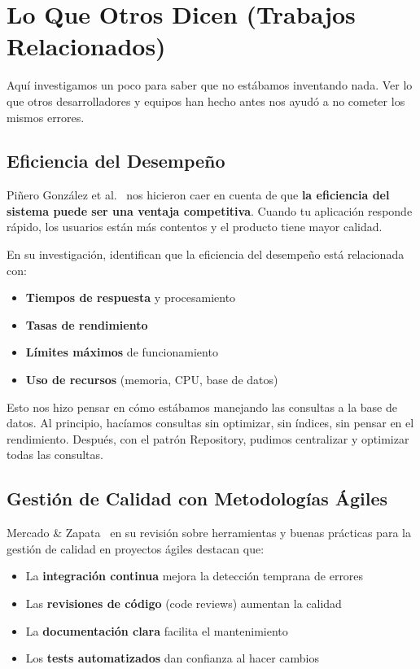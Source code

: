 \section{Lo Que Otros Dicen (Trabajos Relacionados)}

Aquí investigamos un poco para saber que no estábamos inventando nada. Ver lo que otros desarrolladores y equipos han hecho antes nos ayudó a no cometer los mismos errores.

\subsection{Eficiencia del Desempeño}

Piñero González et al.~\cite{pinero2021buenas} nos hicieron caer en cuenta de que \textbf{la eficiencia del sistema puede ser una ventaja competitiva}. Cuando tu aplicación responde rápido, los usuarios están más contentos y el producto tiene mayor calidad.

En su investigación, identifican que la eficiencia del desempeño está relacionada con:
\begin{itemize}
    \item \textbf{Tiempos de respuesta} y procesamiento
    \item \textbf{Tasas de rendimiento}
    \item \textbf{Límites máximos} de funcionamiento
    \item \textbf{Uso de recursos} (memoria, CPU, base de datos)
\end{itemize}

Esto nos hizo pensar en cómo estábamos manejando las consultas a la base de datos. Al principio, hacíamos consultas sin optimizar, sin índices, sin pensar en el rendimiento. Después, con el patrón Repository, pudimos centralizar y optimizar todas las consultas.

\subsection{Gestión de Calidad con Metodologías Ágiles}

Mercado \& Zapata~\cite{mercado2019revision} en su revisión sobre herramientas y buenas prácticas para la gestión de calidad en proyectos ágiles destacan que:

\begin{itemize}
    \item La \textbf{integración continua} mejora la detección temprana de errores
    \item Las \textbf{revisiones de código} (code reviews) aumentan la calidad
    \item La \textbf{documentación clara} facilita el mantenimiento
    \item Los \textbf{tests automatizados} dan confianza al hacer cambios
\end{itemize}

